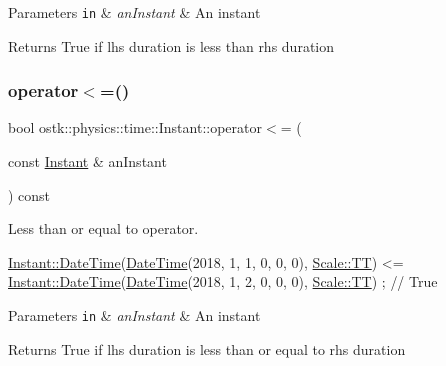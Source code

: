 \begin{DoxyParams}[1]{Parameters}
\mbox{\tt in}  & {\em an\+Instant} & An instant \\
\hline
\end{DoxyParams}
\begin{DoxyReturn}{Returns}
True if lhs duration is less than rhs duration 
\end{DoxyReturn}
\mbox{\label{classostk_1_1physics_1_1time_1_1_instant_a6c9a495ac6041a46602def3c0eaaef33}} 
\subsubsection{\texorpdfstring{operator$<$=()}{operator<=()}}
{\footnotesize\ttfamily bool ostk\+::physics\+::time\+::\+Instant\+::operator$<$= (\begin{DoxyParamCaption}\item[{const \hyperlink{classostk_1_1physics_1_1time_1_1_instant}{Instant} \&}]{an\+Instant }\end{DoxyParamCaption}) const}



Less than or equal to operator. 


\begin{DoxyCode}
\hyperlink{classostk_1_1physics_1_1time_1_1_instant_afd5725574a02389b80fad4baff313c8a}{Instant::DateTime}(\hyperlink{classostk_1_1physics_1_1time_1_1_instant_afd5725574a02389b80fad4baff313c8a}{DateTime}(2018, 1, 1, 0, 0, 0), 
      \hyperlink{namespaceostk_1_1physics_1_1time_adf23d37bd8641fb76a0e98ab46a70df7adf1f3edb9115acb0a1e04209b7a9937b}{Scale::TT}) <= \hyperlink{classostk_1_1physics_1_1time_1_1_instant_afd5725574a02389b80fad4baff313c8a}{Instant::DateTime}(\hyperlink{classostk_1_1physics_1_1time_1_1_instant_afd5725574a02389b80fad4baff313c8a}{DateTime}(2018, 1, 2, 0, 0, 0), 
      \hyperlink{namespaceostk_1_1physics_1_1time_adf23d37bd8641fb76a0e98ab46a70df7adf1f3edb9115acb0a1e04209b7a9937b}{Scale::TT}) ; \textcolor{comment}{// True}
\end{DoxyCode}



\begin{DoxyParams}[1]{Parameters}
\mbox{\tt in}  & {\em an\+Instant} & An instant \\
\hline
\end{DoxyParams}
\begin{DoxyReturn}{Returns}
True if lhs duration is less than or equal to rhs duration 
\end{DoxyReturn}
\mbox{\label{classostk_1_1physics_1_1time_1_1_instant_a701dd98cce0e8b7536aab09555a889f2}} 
